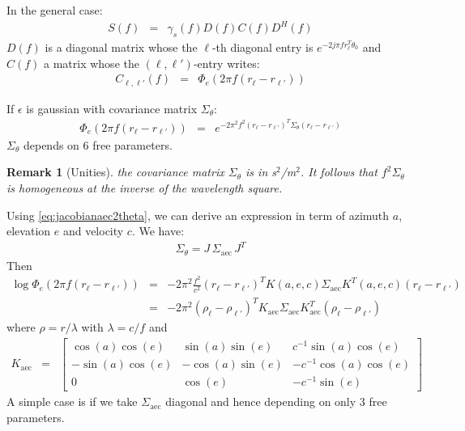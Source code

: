 \documentclass[a4paper, 12pt]{report}
\newtheorem{remark}{Remark}
\def\aec{\mathrm{aec}}
\begin{document}
In the general case:
\begin{eqnarray*}
 S(f) &=& \gamma_s(f)D(f)C(f)D^H(f)
\end{eqnarray*}
$D(f)$ is a diagonal matrix whose the $\ell$-th diagonal entry is $e^{-2j\pi f r_{\ell}^T\theta_0}$ and $C(f)$ a matrix whose the $(\ell,\ell')$-entry writes:
\begin{eqnarray*}
 C_{\ell,\ell'}(f) &=& \Phi_{e}(2\pi f(r_{\ell}-r_{\ell'}))
\end{eqnarray*}

If $\epsilon$ is gaussian with covariance matrix $\Sigma_{\theta}$:
\begin{eqnarray*}
 \Phi_{e}(2\pi f(r_{\ell}-r_{\ell'}))&=& e^{-2\pi^2f^2 (r_{\ell}-r_{\ell'})^T\Sigma_{\theta}(r_{\ell}-r_{\ell'})}
\end{eqnarray*}
$\Sigma_{\theta}$ depends on 6 free parameters. 

\begin{remark}[Unities]
the covariance matrix $\Sigma_{\theta}$ is in s$^2$/m$^2$. It follows that $f^2 \Sigma_{\theta}$ is homogeneous at the inverse of the wavelength square.
\end{remark}


Using \eqref{eq:jacobianaec2theta}, we can derive an expression in term of azimuth $a$, elevation $e$ and velocity $c$. We have:
\begin{eqnarray*}
\Sigma_{\theta}=J\,\Sigma_{\aec}\,J^{T}
\end{eqnarray*}
Then
\begin{eqnarray*}
 \log \Phi_{e}(2\pi f(r_{\ell}-r_{\ell'}))&=& 
-2\pi^2\frac{f^2}{c^2} (r_{\ell}-r_{\ell'})^TK(a,e,c)\Sigma_{\aec}K^T(a,e,c)(r_{\ell}-r_{\ell'})
\\
&=&
-2\pi^2(\rho_{\ell}-\rho_{\ell'})^TK_{\aec}\Sigma_{\aec}K^T_{\aec}(\rho_{\ell}-\rho_{\ell'})
\end{eqnarray*}
where $\rho=r/\lambda$ with $\lambda=c/f$ and
\begin{eqnarray*}
K_{\aec}&=&
\begin{bmatrix}
\cos(a)\cos(e)&\sin(a)\sin(e)&c^{-1}\sin(a)\cos(e)
\\
-\sin(a)\cos(e)&-\cos(a)\sin(e)&-c^{-1}\cos(a)\cos(e)
\\
0&\cos(e)&-c^{-1}\sin(e)
\end{bmatrix}
\end{eqnarray*}
A simple case is if we take $\Sigma_{\aec}$ diagonal and hence depending on only 3 free parameters. 
\end{document}
